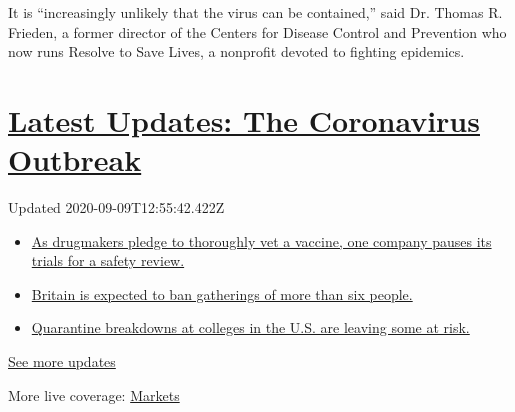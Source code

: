 It is ``increasingly unlikely that the virus can be contained,'' said
Dr. Thomas R. Frieden, a former director of the Centers for Disease
Control and Prevention who now runs Resolve to Save Lives, a nonprofit
devoted to fighting epidemics.

\hypertarget{latest-updates-the-coronavirus-outbreak}{%
\section{\texorpdfstring{\href{https://www.nytimes3xbfgragh.onion/2020/09/09/world/covid-19-coronavirus.html?action=click\&pgtype=Article\&state=default\&region=MAIN_CONTENT_1\&context=storylines_live_updates}{Latest
Updates: The Coronavirus
Outbreak}}{Latest Updates: The Coronavirus Outbreak}}\label{latest-updates-the-coronavirus-outbreak}}

Updated 2020-09-09T12:55:42.422Z

\begin{itemize}
\tightlist
\item
  \href{https://www.nytimes3xbfgragh.onion/2020/09/09/world/covid-19-coronavirus.html?action=click\&pgtype=Article\&state=default\&region=MAIN_CONTENT_1\&context=storylines_live_updates\#link-70cea8bb}{As
  drugmakers pledge to thoroughly vet a vaccine, one company pauses its
  trials for a safety review.}
\item
  \href{https://www.nytimes3xbfgragh.onion/2020/09/09/world/covid-19-coronavirus.html?action=click\&pgtype=Article\&state=default\&region=MAIN_CONTENT_1\&context=storylines_live_updates\#link-780eaa2f}{Britain
  is expected to ban gatherings of more than six people.}
\item
  \href{https://www.nytimes3xbfgragh.onion/2020/09/09/world/covid-19-coronavirus.html?action=click\&pgtype=Article\&state=default\&region=MAIN_CONTENT_1\&context=storylines_live_updates\#link-11cec4c0}{Quarantine
  breakdowns at colleges in the U.S. are leaving some at risk.}
\end{itemize}

\href{https://www.nytimes3xbfgragh.onion/2020/09/09/world/covid-19-coronavirus.html?action=click\&pgtype=Article\&state=default\&region=MAIN_CONTENT_1\&context=storylines_live_updates}{See
more updates}

More live coverage:
\href{https://www.nytimes3xbfgragh.onion/live/2020/09/09/business/stock-market-today-coronavirus?action=click\&pgtype=Article\&state=default\&region=MAIN_CONTENT_1\&context=storylines_live_updates}{Markets}


